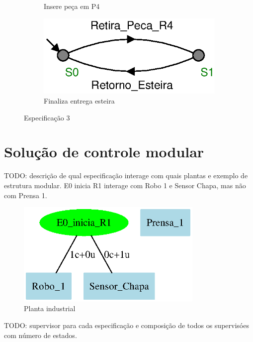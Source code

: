 \begin{figure}[H]
\begin{subfigure}{0.45\textwidth}
      \caption{Insere peça em P4}
      \label{fig:e89c}
  \end{subfigure}
  \hfill
  \begin{subfigure}{0.45\textwidth}
      \centering
      \includegraphics[width=\textwidth]{imagens/E9_finaliza_entrega_P4.eps}
      \caption{Finaliza entrega esteira}
      \label{fig:e89d}
  \end{subfigure}
  \caption{Especificação 3}
  \label{fig:e89}
\end{figure}

\section{Solução de controle modular}
TODO: descrição de qual especificação interage com quais plantas e exemplo de estrutura modular.
E0 inicia R1 interage com Robo 1 e Sensor Chapa, mas não com Prensa 1.
\begin{figure}[H]%
  \centering
  \includegraphics[width=0.8\textwidth]{imagens/modular_E0_inicia.eps}
  \caption{Planta industrial}\label{fig:modular}
\end{figure}

TODO: supervisor para cada especificação e composição de todos os supervisóes com número de estados. 